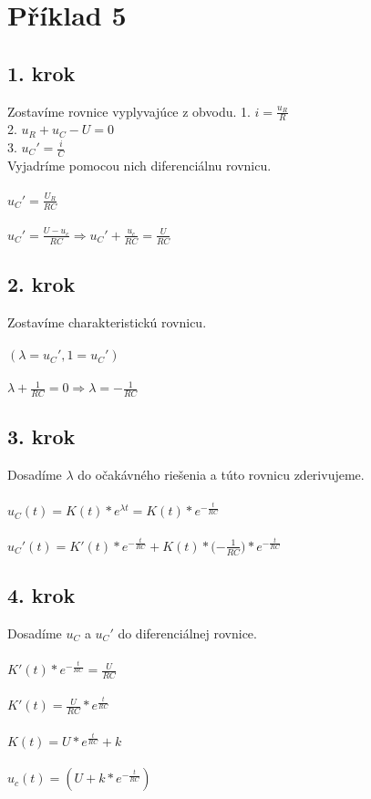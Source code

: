 \section{Příklad 5}

\subsection*{1. krok}
Zostavíme rovnice vyplyvajúce z obvodu.
1. $i=\frac{u_R}{R}$\\
2. $u_R+u_C-U=0$ \\
3. ${u_C}'=\frac{i}{C}$\\

Vyjadríme pomocou nich diferenciálnu rovnicu.\\\\
${u_C}'=\frac{U_R}{RC}$\\\\
${u_C}'=\frac{U-u_c}{RC}\Longrightarrow{u_C}'+\frac{u_c}{RC}=\frac{U}{RC}$\\

\subsection*{2. krok}
Zostavíme charakteristickú rovnicu.\\\\
$(\lambda={u_C}',1={u_C}')$\\\\
$\lambda+\frac{1}{RC}=0 \Rightarrow \lambda=-\frac{1}{RC}$\\

\subsection*{3. krok}
Dosadíme $\lambda$ do očakávného riešenia a túto rovnicu zderivujeme.\\\\
${u_C}(t)=K(t)*e^{\lambda t}=K(t)*e^{-{\frac{t}{RC}}}$\\\\
${u_C}'(t)=K'(t)*e^{-\frac{t}{RC}}+K(t)*{(-\frac{1}{RC}})*e^{-\frac{t}{RC}}$\\

\subsection*{4. krok}
Dosadíme $u_C$ a ${u_C}'$ do diferenciálnej rovnice.\\\\
$K'(t)*e^{-\frac{t}{RC}}=\frac{U}{RC}$\\\\
$K'(t)=\frac{U}{RC}*e^{\frac{t}{RC}}$\\\\
$K(t)=U*e^{\frac{t}{RC}}+k$\\\\
$u_c(t)=(U+k*e^{-\frac{t}{RC}})$\\

